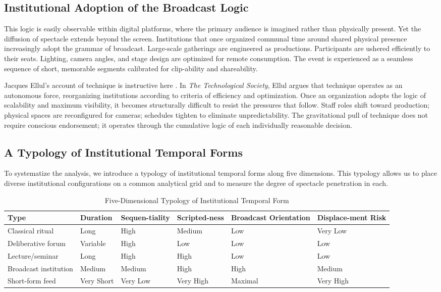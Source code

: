\documentclass[12pt]{article}
\theoremstyle{definition}
\theoremstyle{plain}
\begin{document}
\subsection{Institutional Adoption of the Broadcast Logic}

This logic is easily observable within digital platforms, where the primary audience is imagined rather than physically present. Yet the diffusion of spectacle extends beyond the screen. Institutions that once organized communal time around shared physical presence increasingly adopt the grammar of broadcast. Large-scale gatherings are engineered as productions. Participants are ushered efficiently to their seats. Lighting, camera angles, and stage design are optimized for remote consumption. The event is experienced as a seamless sequence of short, memorable segments calibrated for clip-ability and shareability.

Jacques Ellul's account of technique is instructive here \citep{Ellul1964}. In \emph{The Technological Society}, Ellul argues that technique operates as an autonomous force, reorganizing institutions according to criteria of efficiency and optimization. Once an organization adopts the logic of scalability and maximum visibility, it becomes structurally difficult to resist the pressures that follow. Staff roles shift toward production; physical spaces are reconfigured for cameras; schedules tighten to eliminate unpredictability. The gravitational pull of technique does not require conscious endorsement; it operates through the cumulative logic of each individually reasonable decision.

\subsection{A Typology of Institutional Temporal Forms}

To systematize the analysis, we introduce a typology of institutional temporal forms along five dimensions. This typology allows us to place diverse institutional configurations on a common analytical grid and to measure the degree of spectacle penetration in each.

\begin{table}[h!]
\centering
\caption{Five-Dimensional Typology of Institutional Temporal Form}
\label{tab:typology}
\renewcommand{\arraystretch}{1.4}
\begin{tabularx}{\textwidth}{@{}lXXXXX@{}}
\toprule
\textbf{Type} & \textbf{Duration} & \textbf{Sequen-tiality} & \textbf{Scripted-ness} & \textbf{Broadcast Orientation} & \textbf{Displace-ment Risk} \\
\midrule
Classical ritual & Long & High & Medium & Low & Very Low \\
Deliberative forum & Variable & High & Low & Low & Low \\
Lecture/seminar & Long & High & High & Low & Low \\
Broadcast institution & Medium & Medium & High & High & Medium \\
Short-form feed & Very Short & Very Low & Very High & Maximal & Very High \\
\bottomrule
\end{tabularx}
\end{table}
\end{document}
